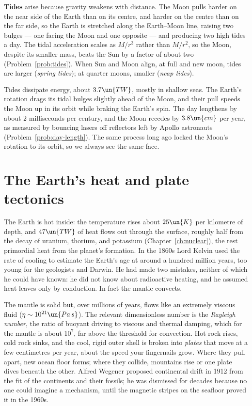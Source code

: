 \textbf{Tides} arise because gravity weakens with distance. The Moon pulls harder on the near side of the Earth than on its centre, and harder on the centre than on the far side, so the Earth is stretched along the Earth--Moon line, raising two bulges --- one facing the Moon and one opposite --- and producing two high tides a day. The tidal acceleration scales as $M/r^3$ rather than $M/r^2$, so the Moon, despite its smaller mass, beats the Sun by a factor of about two (Problem~\ref{prob:tides}). When Sun and Moon align, at full and new moon, tides are larger (\emph{spring tides}); at quarter moons, smaller (\emph{neap tides}).

Tides dissipate energy, about $3.7\un{TW}$, mostly in shallow seas. The Earth's rotation drags its tidal bulges slightly ahead of the Moon, and their pull speeds the Moon up in its orbit while braking the Earth's spin. The day lengthens by about $2$ milliseconds per century, and the Moon recedes by $3.8\un{cm}$ per year, as measured by bouncing lasers off reflectors left by Apollo astronauts (Problem~\ref{prob:day-length}). The same process long ago locked the Moon's rotation to its orbit, so we always see the same face.

\section{The Earth's heat and plate tectonics}

The Earth is hot inside: the temperature rises about $25\un{K}$ per kilometre of depth, and $47\un{TW}$ of heat flows out through the surface, roughly half from the decay of uranium, thorium, and potassium (Chapter~\ref{ch:nuclear}), the rest primordial heat from the planet's formation. In the 1860s Lord Kelvin used the rate of cooling to estimate the Earth's age at around a hundred million years, too young for the geologists and Darwin. He had made two mistakes, neither of which he could have known: he did not know about radioactive heating, and he assumed heat leaves only by conduction. In fact the mantle convects.

The mantle is solid but, over millions of years, flows like an extremely viscous fluid ($\eta\sim10^{21}\un{Pa\,s}$). The relevant dimensionless number is the \emph{Rayleigh number}, the ratio of buoyant driving to viscous and thermal damping, which for the mantle is about $10^7$, far above the threshold for convection. Hot rock rises, cold rock sinks, and the cool, rigid outer shell is broken into \emph{plates} that move at a few centimetres per year, about the speed your fingernails grow. Where they pull apart, new ocean floor forms; where they collide, mountains rise or one plate dives beneath the other. Alfred Wegener proposed continental drift in 1912 from the fit of the continents and their fossils; he was dismissed for decades because no one could imagine a mechanism, until the magnetic stripes on the seafloor proved it in the 1960s.


